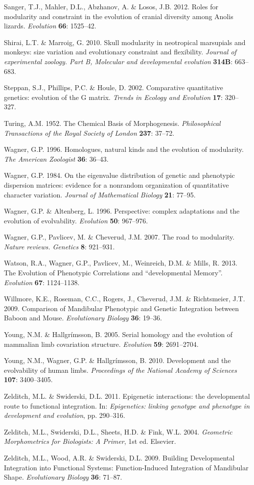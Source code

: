 \documentclass[12pt,]{article}
\begin{document}
Sanger, T.J., Mahler, D.L., Abzhanov, A. \& Losos, J.B. 2012. Roles for
modularity and constraint in the evolution of cranial diversity among
Anolis lizards. \emph{Evolution} \textbf{66}: 1525--42.

Shirai, L.T. \& Marroig, G. 2010. Skull modularity in neotropical
marsupials and monkeys: size variation and evolutionary constraint and
flexibility. \emph{Journal of experimental zoology. Part B, Molecular
and developmental evolution} \textbf{314B}: 663--683.

Steppan, S.J., Phillips, P.C. \& Houle, D. 2002. Comparative
quantitative genetics: evolution of the G matrix. \emph{Trends in
Ecology and Evolution} \textbf{17}: 320--327.

Turing, A.M. 1952. The Chemical Basis of Morphogenesis.
\emph{Philosophical Transactions of the Royal Society of London}
\textbf{237}: 37--72.

Wagner, G.P. 1996. Homologues, natural kinds and the evolution of
modularity. \emph{The American Zoologist} \textbf{36}: 36--43.

Wagner, G.P. 1984. On the eigenvalue distribution of genetic and
phenotypic dispersion matrices: evidence for a nonrandom organization of
quantitative character variation. \emph{Journal of Mathematical Biology}
\textbf{21}: 77--95.

Wagner, G.P. \& Altenberg, L. 1996. Perspective: complex adaptations and
the evolution of evolvability. \emph{Evolution} \textbf{50}: 967--976.

Wagner, G.P., Pavlicev, M. \& Cheverud, J.M. 2007. The road to
modularity. \emph{Nature reviews. Genetics} \textbf{8}: 921--931.

Watson, R.A., Wagner, G.P., Pavlicev, M., Weinreich, D.M. \& Mills, R.
2013. The Evolution of Phenotypic Correlations and ``developmental
Memory''. \emph{Evolution} \textbf{67}: 1124--1138.

Willmore, K.E., Roseman, C.C., Rogers, J., Cheverud, J.M. \&
Richtsmeier, J.T. 2009. Comparison of Mandibular Phenotypic and Genetic
Integration between Baboon and Mouse. \emph{Evolutionary Biology}
\textbf{36}: 19--36.

Young, N.M. \& Hallgrímsson, B. 2005. Serial homology and the evolution
of mammalian limb covariation structure. \emph{Evolution} \textbf{59}:
2691--2704.

Young, N.M., Wagner, G.P. \& Hallgrímsson, B. 2010. Development and the
evolvability of human limbs. \emph{Proceedings of the National Academy
of Sciences} \textbf{107}: 3400--3405.

Zelditch, M.L. \& Swiderski, D.L. 2011. Epigenetic interactions: the
developmental route to functional integration. In: \emph{Epigenetics:
linking genotype and phenotype in development and evolution}, pp.
290--316.

Zelditch, M.L., Swiderski, D.L., Sheets, H.D. \& Fink, W.L. 2004.
\emph{Geometric Morphometrics for Biologists: A Primer}, 1st ed.
Elsevier.

Zelditch, M.L., Wood, A.R. \& Swiderski, D.L. 2009. Building
Developmental Integration into Functional Systems: Function-Induced
Integration of Mandibular Shape. \emph{Evolutionary Biology}
\textbf{36}: 71--87.
\end{document}
